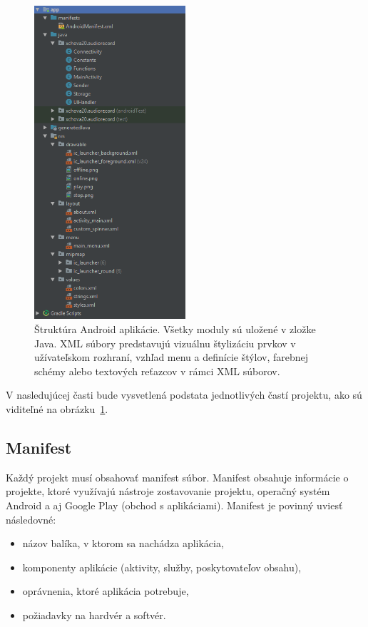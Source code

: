 \begin{figure}[!hbt]
	\centering
	\includegraphics[width=0.5\textwidth]{obrazky-figures/structure-example.png}
	\caption{Štruktúra Android aplikácie. Všetky moduly sú uložené v zložke Java. XML súbory predstavujú vizuálnu štylizáciu prvkov v užívateľskom rozhraní, vzhľad menu a definície štýlov, farebnej schémy alebo textových reťazcov v rámci XML súborov.}
	\label{structure-example}
\end{figure}

V nasledujúcej časti bude vysvetlená podstata jednotlivých častí projektu, ako sú viditeľné na obrázku~\ref{structure-example}.

\subsection*{Manifest}
\label{manifest}

Každý projekt musí obsahovať manifest súbor. Manifest obsahuje informácie o projekte, ktoré využívajú nástroje zostavovanie projektu, operačný systém Android a aj Google Play (obchod s aplikáciami). Manifest je povinný uviesť následovné:
\begin{itemize}
\item{názov balíka, v ktorom sa nachádza aplikácia,}
\item{komponenty aplikácie (aktivity, služby, poskytovateľov obsahu),}
\item{oprávnenia, ktoré aplikácia potrebuje,}
\item{požiadavky na hardvér a softvér.}
\end{itemize}

